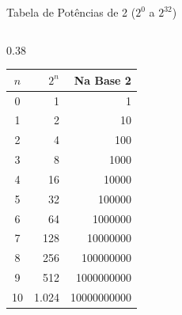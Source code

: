\begin{frame}{Tabela de Potências de 2 ($2^0$ a $2^{32}$)}
    \centering

    \begin{columns}[t]
        \begin{column}{0.38\textwidth}
            \centering
            \begin{tabular}{|c|r|r|}
                \hline
                \textbf{$n$} & \textbf{$2^n$} & \textbf{Na Base 2} \\ \hline
                0            & 1              & 1                  \\ \hline
                1            & 2              & 10                 \\ \hline
                2            & 4              & 100                \\ \hline
                3            & 8              & 1000               \\ \hline
                4            & 16             & 10000              \\ \hline
                5            & 32             & 100000             \\ \hline
                6            & 64             & 1000000            \\ \hline
                7            & 128            & 10000000           \\ \hline
                8            & 256            & 100000000          \\ \hline
                9            & 512            & 1000000000         \\ \hline
                10           & 1.024          & 10000000000        \\ \hline
            \end{tabular}
        \end{column}


\end{columns}
\end{frame}
